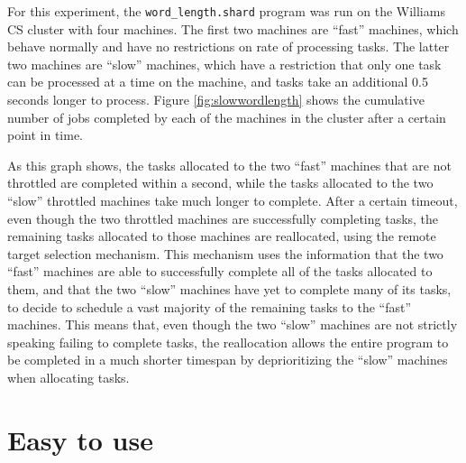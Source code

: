 \documentclass[twoside]{report}
\begin{document}
For this experiment, the \texttt{word\_length.shard} program was run on the Williams CS cluster with four machines.
The first two machines are ``fast'' machines, which behave normally and have no restrictions on rate of processing tasks.
The latter two machines are ``slow'' machines, which have a restriction that only one task can be processed at a time on the machine, and tasks take an additional 0.5 seconds longer to process.
Figure \ref{fig:slowwordlength} shows the cumulative number of jobs completed by each of the machines in the cluster after a certain point in time.

As this graph shows, the tasks allocated to the two ``fast'' machines that are not throttled are completed within a second, while the tasks allocated to the two ``slow'' throttled machines take much longer to complete.
After a certain timeout, even though the two throttled machines are successfully completing tasks, the remaining tasks allocated to those machines are reallocated, using the remote target selection mechanism.
This mechanism uses the information that the two ``fast'' machines are able to successfully complete all of the tasks allocated to them, and that the two ``slow'' machines have yet to complete many of its tasks, to decide to schedule a vast majority of the remaining tasks to the ``fast'' machines.
This means that, even though the two ``slow'' machines are not strictly speaking failing to complete tasks, the reallocation allows the entire program to be completed in a much shorter timespan by deprioritizing the ``slow'' machines when allocating tasks.

\section{Easy to use}

\end{document}
